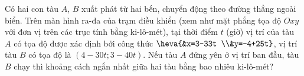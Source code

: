 \begin{bt}%
	Có hai con tàu $A$, $B$ xuất phát từ hai bến, chuyển động theo đường thẳng ngoài  biển. Trên màn hình ra-đa của trạm điều khiển (xem như mặt phẳng tọa độ $Oxy$ với đơn vị trên các trục tính bằng ki-lô-mét), tại thời điểm $t$ (giờ) vị trí của tàu $A$ có tọa độ được xác định bởi công thức $\heva{&x=3-33t \\&y=-4+25t}$, vị trí tàu $B$ có tọa độ là $(4-30t; 3-40t)$. Nếu tàu $A$ đứng yên ở vị trí ban đầu, tàu $B$ chạy thì khoảng cách ngắn nhất giữa hai tàu bằng bao nhiêu ki-lô-mét?
\end{bt}

